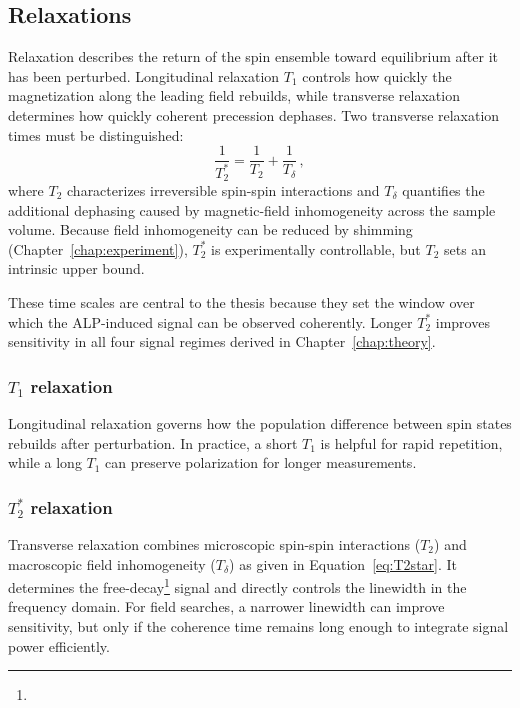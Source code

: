 \subsection{Relaxations}\label{sec:NMR:Relax}
Relaxation describes the return of the spin ensemble toward equilibrium after it has been perturbed.
Longitudinal relaxation $T_1$ controls how quickly the magnetization along the leading field rebuilds, while transverse relaxation determines how quickly coherent precession dephases.
Two transverse relaxation times must be distinguished:
\begin{equation}
    \frac{1}{T_2^*} = \frac{1}{T_2} + \frac{1}{T_\delta}
    \,,\label{eq:T2star}
\end{equation}
where $T_2$ characterizes irreversible spin-spin interactions and $T_\delta$ quantifies the additional dephasing caused by magnetic-field inhomogeneity across the sample volume.
Because field inhomogeneity can be reduced by shimming (Chapter~\ref{chap:experiment}), $T_2^*$ is experimentally controllable, but $T_2$ sets an intrinsic upper bound.

These time scales are central to the thesis because they set the window over which the ALP-induced signal can be observed coherently.
Longer $T_2^*$ improves sensitivity in all four signal regimes derived in Chapter~\ref{chap:theory}.

\subsubsection{$T_1$ relaxation}\label{sec:NMR:Relax:T1}
Longitudinal relaxation governs how the population difference between spin states rebuilds after perturbation.
In practice, a short $T_1$ is helpful for rapid repetition, while a long $T_1$ can preserve polarization for longer measurements.

\subsubsection{$T_2^*$ relaxation}\label{sec:NMR:Relax:T2}
Transverse relaxation combines microscopic spin-spin interactions ($T_2$) and macroscopic field inhomogeneity ($T_\delta$) as given in Equation~\eqref{eq:T2star}.
It determines the free-decay\footnote{} signal and directly controls the linewidth in the frequency domain.
For field searches, a narrower linewidth can improve sensitivity, but only if the coherence time remains long enough to integrate signal power efficiently.

